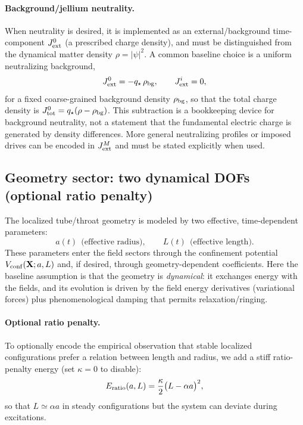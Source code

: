 \documentclass[11pt]{article}
\newcommand{\qstar}{q_\star}
\newcommand{\rhobg}{\rho_{\rm bg}}
\begin{document}
\paragraph{Background/jellium neutrality.}
When neutrality is desired, it is implemented as an external/background time-component $J_{\rm ext}^0$ (a prescribed charge density), and must be distinguished from the dynamical matter density $\rho=|\psi|^2$. A common baseline choice is a uniform neutralizing background,
\begin{equation}
J_{\rm ext}^0=-\qstar\,\rhobg,\qquad J_{\rm ext}^i=0,
\end{equation}
for a fixed coarse-grained background density $\rhobg$, so that the total charge density is $J_{\rm tot}^0=\qstar(\rho-\rhobg)$. This subtraction is a bookkeeping device for background neutrality, not a statement that the fundamental electric charge is generated by density differences. More general neutralizing profiles or imposed drives can be encoded in $J_{\rm ext}^M$ and must be stated explicitly when used.

\subsection{Geometry sector: two dynamical DOFs (optional ratio penalty)}
\label{sec:action-geom}

The localized tube/throat geometry is modeled by two effective, time-dependent parameters:
\begin{equation}
a(t)\ \ \text{(effective radius)}, \qquad
L(t)\ \ \text{(effective length)}.
\end{equation}
These parameters enter the field sectors through the confinement potential $V_{\rm conf}(\mathbf{X};a,L)$ and, if desired, through geometry-dependent coefficients. Here the baseline assumption is that the geometry is \emph{dynamical}: it exchanges energy with the fields, and its evolution is driven by the field energy derivatives (variational forces) plus phenomenological damping that permits relaxation/ringing.

\paragraph{Optional ratio penalty.}
To optionally encode the empirical observation that stable localized configurations prefer a relation between length and radius, we add a stiff ratio-penalty energy (set $\kappa=0$ to disable):
\begin{equation}
E_{\rm ratio}(a,L)=\frac{\kappa}{2}\big(L-\alpha a\big)^2,
\label{eq:Eratio}
\end{equation}
so that $L\simeq \alpha a$ in steady configurations but the system can deviate during excitations.
\end{document}
